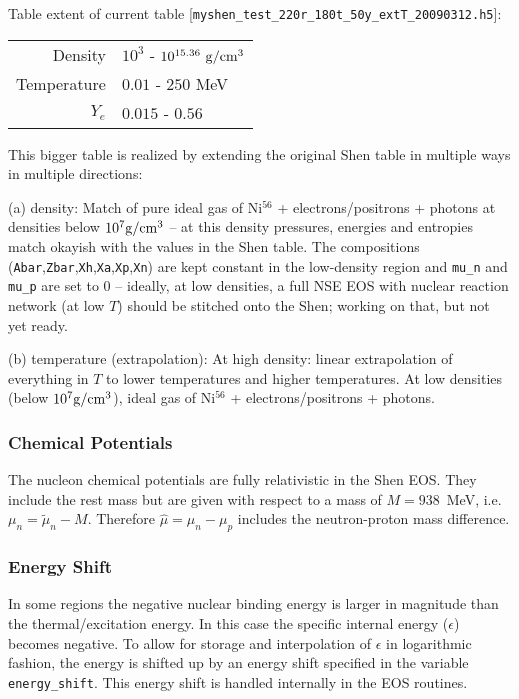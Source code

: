 \documentclass[10pt,nofootinbib]{article}
\newcommand{\code}[1]{\texttt{#1}}
\begin{document}
Table extent of current table [\code{myshen\_test\_220r\_180t\_50y\_extT\_20090312.h5}]:
\begin{table}[ht]
\begin{tabular}{r|l}
Density & $10^{3}$ - $10^{15.36}\ \rm{g}/\rm{cm}^3$ \\[0.2mm]
Temperature & $0.01$ - $250$ MeV \\[0.2mm]
$Y_e$ & $0.015$ - $0.56$
\end{tabular}
\end{table}

This bigger table is realized by extending the original Shen table in
multiple ways in multiple directions:\newline
\newline
 
(a) density: \newline Match of pure ideal gas of Ni$^{56}$ +
electrons/positrons + photons at densities below $10^7
\rm{g}/\rm{cm}^3$ -- at this density pressures, energies and entropies
match okayish with the values in the Shen table. The compositions
(\code{Abar},\code{Zbar},\code{Xh},\code{Xa},\code{Xp},\code{Xn}) are
kept constant in the low-density region and \code{mu\_n} and
\code{mu\_p} are set to 0 -- ideally, at low densities, a full NSE EOS
with nuclear reaction network (at low $T$) should be stitched onto the
Shen; working on that, but not yet ready.  \newline \newline

(b) temperature (extrapolation): \newline At high density: linear
extrapolation of everything in $T$ to lower temperatures and higher
temperatures. At low densities (below $10^7 \rm{g}/\rm{cm}^3$), ideal
gas of Ni$^{56}$ + electrons/positrons + photons.

\subsubsection{Chemical Potentials}
The nucleon chemical potentials are fully relativistic in the Shen
EOS.  They include the rest mass but are given with respect to a
mass of $M = 938$~MeV, i.e. $\mu_n = \tilde{\mu}_n - M$.  Therefore
$\hat{\mu} = \mu_n-\mu_p$ includes the neutron-proton mass difference.

\subsubsection{Energy Shift}
In some regions the negative nuclear binding energy is larger in
magnitude than the thermal/excitation energy. In this case the
specific internal energy ($\epsilon$) becomes negative. To allow for storage
and interpolation of $\epsilon$ in logarithmic fashion, the energy is shifted
up by an energy shift specified in the variable \code{energy\_shift}. This
energy shift is handled internally in the EOS routines.
\end{document}
